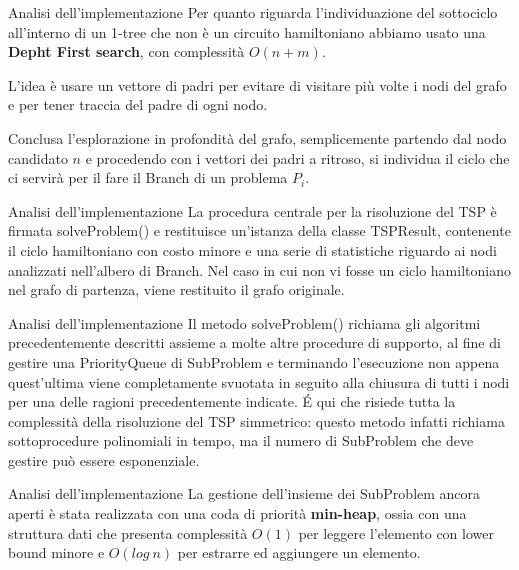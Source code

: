 \documentclass[10pt]{beamer}
\begin{document}
\begin{frame}{Analisi dell'implementazione}
    Per quanto riguarda l'individuazione del sottociclo all'interno di un 1-tree che non è un circuito hamiltoniano abbiamo usato una \textbf{Depht First search}, con complessità $O(n+m)$.
    
    L'idea è usare un vettore di padri per evitare di visitare più volte i nodi del grafo e per tener traccia del padre di ogni nodo. 
    
    Conclusa l'esplorazione in profondità del grafo, semplicemente partendo dal nodo candidato $n$ e procedendo con i vettori dei padri a ritroso, si individua il ciclo che ci servirà per il fare il Branch di un problema $P_i$.
\end{frame}

\begin{frame}{Analisi dell'implementazione}
    La procedura centrale per la risoluzione del TSP è firmata {\selectfont solveProblem()} e restituisce un'istanza della classe {\selectfont TSPResult}, contenente il ciclo hamiltoniano con costo minore e una serie di statistiche riguardo ai nodi analizzati nell'albero di Branch.
    \newline
    \newline
    Nel caso in cui non vi fosse un ciclo hamiltoniano nel grafo di partenza, viene restituito il grafo originale.
\end{frame}

\begin{frame}{Analisi dell'implementazione}
    Il metodo {\selectfont solveProblem()} richiama gli algoritmi precedentemente descritti assieme a molte altre procedure di supporto, al fine di gestire una {\selectfont PriorityQueue} di {\selectfont SubProblem} e terminando l'esecuzione non appena quest'ultima viene completamente svuotata in seguito alla chiusura di tutti i nodi per una delle ragioni precedentemente indicate. 
    \newline
    \newline
    \'E qui che risiede tutta la complessità della risoluzione del TSP simmetrico: questo metodo infatti richiama sottoprocedure polinomiali in tempo, ma il numero di {\selectfont SubProblem} che deve gestire può essere esponenziale.
\end{frame}

\begin{frame}{Analisi dell'implementazione}
    La gestione dell'insieme dei {\selectfont SubProblem} ancora aperti è stata realizzata con una coda di priorità \textbf{min-heap}, ossia con una struttura dati che presenta complessità $O(1)$ per leggere l'elemento con lower bound minore e $O(log\:n)$ per estrarre ed aggiungere un elemento.
\end{frame}
\end{document}
